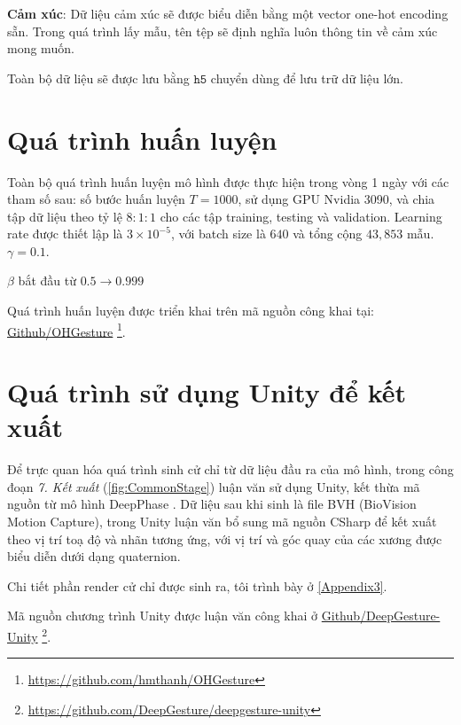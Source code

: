 \textbf{Cảm xúc}: Dữ liệu cảm xúc sẽ được biểu diễn bằng một vector one-hot encoding sẵn. Trong quá trình lấy mẫu, tên tệp sẽ định nghĩa luôn thông tin về cảm xúc mong muốn.

Toàn bộ dữ liệu sẽ được lưu bằng $\texttt{h5}$ chuyển dùng để lưu trữ dữ liệu lớn.




\section{Quá trình huấn luyện}

Toàn bộ quá trình huấn luyện mô hình được thực hiện trong vòng 1 ngày với các tham số sau: số bước huấn luyện $T = 1000$, sử dụng GPU Nvidia 3090, và chia tập dữ liệu theo tỷ lệ $8:1:1$ cho các tập training, testing và validation. Learning rate được thiết lập là $3 \times 10^{-5}$, với batch size là $640$ và tổng cộng $43,853$ mẫu. 
$\gamma = 0.1$.

$\beta$ bắt đầu từ $0.5 \rightarrow 0.999$

Quá trình huấn luyện được triển khai trên mã nguồn công khai tại: \hyperlink{https://github.com/hmthanh/OHGesture}{Github/OHGesture} \footnote{\url{https://github.com/hmthanh/OHGesture}}.




\section{Quá trình sử dụng Unity để kết xuất}
\label{sec:Render}

Để trực quan hóa quá trình sinh cử chỉ từ dữ liệu đầu ra của mô hình, trong công đoạn \textit{7. Kết xuất} (\autoref{fig:CommonStage}) luận văn sử dụng Unity, kết thừa mã nguồn từ mô hình DeepPhase \cite{starke2022deepphase}  . Dữ liệu sau khi sinh là file BVH (BioVision Motion Capture), trong Unity luận văn bổ sung mã nguồn CSharp để kết xuất theo vị trí toạ độ và nhãn tương ứng, với vị trí và góc quay của các xương được biểu diễn dưới dạng quaternion.

Chi tiết phần render cử chỉ được sinh ra, tôi trình bày ở \autoref{Appendix3}.

Mã nguồn chương trình Unity được luận văn công khai ở \hyperlink{https://github.com/DeepGesture/deepgesture-unity}{Github/DeepGesture-Unity}
\footnote{\url{https://github.com/DeepGesture/deepgesture-unity}}.
